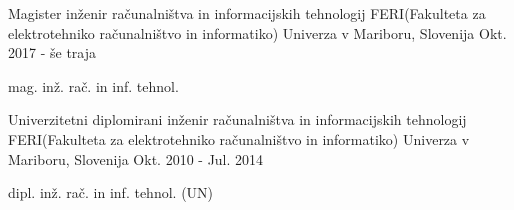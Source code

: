 

\begin{cventries}

  \cventry
    {Magister inženir računalništva in informacijskih tehnologij} %
    {FERI(Fakulteta za elektrotehniko računalništvo in informatiko)} %
    {Univerza v Mariboru, Slovenija} %
    {Okt. 2017 - še traja} %
    {
      \begin{cvitems} %
        \item {mag. inž. rač. in inf. tehnol.}
      \end{cvitems}
    }


\cventry
{Univerzitetni diplomirani inženir računalništva in informacijskih tehnologij} %
{FERI(Fakulteta za elektrotehniko računalništvo in informatiko)} %
{Univerza v Mariboru, Slovenija} %
{Okt. 2010 - Jul. 2014} %
{
  \begin{cvitems} %
    \item {dipl. inž. rač. in inf. tehnol. (UN)}
  \end{cvitems}
}


\end{cventries}
